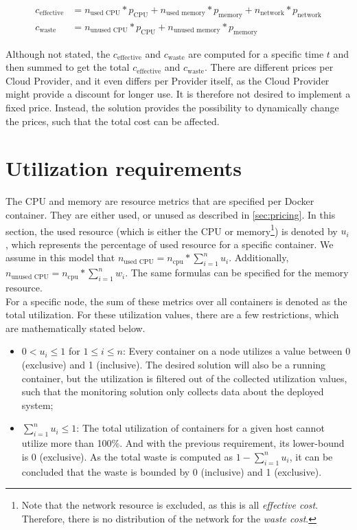 \begin{equation} \label{eq:cost_and_waste}
\begin{split}
c_\text{effective} &=  n_\text{used CPU} * p_\text{CPU} + n_\text{used memory} * p_\text{memory} + n_\text{network} * p_\text{network} \\
c_\text{waste} &=  n_\text{unused CPU} * p_\text{CPU} + n_\text{unused memory} * p_\text{memory}
\end{split}
\end{equation}

\noindent 
Although not stated, the $c_\text{effective}$ and $c_\text{waste}$ are computed for a specific time $t$ and then summed to get the total $c_\text{effective}$ and $c_\text{waste}$. There are different prices per Cloud Provider, and it even differs per Provider itself, as the Cloud Provider might provide a discount for longer use. It is therefore not desired to implement a fixed price. Instead, the solution provides the possibility to dynamically change the prices, such that the total cost can be affected.

\section{Utilization requirements} \label{sec:util_req}
The CPU and memory are resource metrics that are specified per Docker container. They are either used, or unused as described in \autoref{sec:pricing}. In this section, the used resource (which is either the CPU or memory\footnote{Note that the network resource is excluded, as this is all \textit{effective cost}. Therefore, there is no distribution of the network for the \textit{waste cost}.}) is denoted by $u_i$, which represents the percentage of used resource for a specific container. We assume in this model that $n_\text{used CPU} = n_\text{cpu} * \sum_{i=1}^n u_i$. Additionally, $n_\text{unused CPU} = n_\text{cpu} * \sum_{i=1}^n w_i$. The same formulas can be specified for the memory resource.\\

\noindent
For a specific node, the sum of these metrics over all containers is denoted as the total utilization. For these utilization values, there are a few restrictions, which are mathematically stated below.

\begin{itemize}
    \item $0 < u_i \leq 1$ for $1 \leq i \leq n$: Every container on a node utilizes a value between $0$ (exclusive) and 1 (inclusive). The desired solution will also be a running container, but the utilization is filtered out of the collected utilization values, such that the monitoring solution only collects data about the deployed system;
    \item $\sum_{i=1}^n u_i \leq 1$: The total utilization of containers for a given host cannot utilize more than 100\%. And with the previous requirement, its lower-bound is 0 (exclusive). As the total waste is computed as $1 - \sum_{i=1}^n u_i$, it can be concluded that the waste is bounded by 0 (inclusive) and 1 (exclusive).
\end{itemize}



